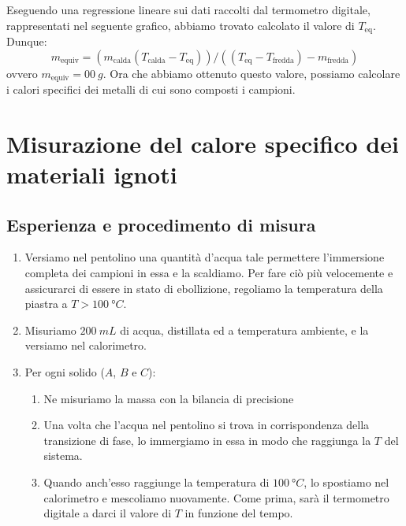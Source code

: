\documentclass{article}
\begin{document}
Eseguendo una regressione lineare sui dati raccolti dal termometro digitale, rappresentati nel    %
seguente grafico, abbiamo trovato calcolato il valore di $T_\text{eq}$. Dunque:
    \[
        m_\text{equiv} = (m_\text{calda} (T_\text{calda}-T_\text{eq}))/((T_\text{eq}-T_\text{fredda}) - m_\text{fredda})
    \]
ovvero $m_\text{equiv} = \qty{00}{g}$. Ora che abbiamo ottenuto questo valore,    %
possiamo calcolare i calori specifici dei metalli di cui sono composti i campioni.



\section{Misurazione del calore specifico dei materiali ignoti}
    
\subsection{Esperienza e procedimento di misura}

\begin{enumerate}
    \item
        Versiamo nel pentolino una quantità d'acqua tale permettere l'immersione
        completa dei campioni in essa e la scaldiamo. Per fare ciò più velocemente
        e assicurarci di essere in stato di ebollizione, regoliamo la temperatura
        della piastra a $T>\qty{100}{\degree C}$.
    \item
        Misuriamo $\qty{200}{mL}$ di acqua, distillata ed a temperatura ambiente,
        e la versiamo nel calorimetro.
    \item
        Per ogni solido ($A$, $B$ e $C$):
    \begin{enumerate}
        \item
            Ne misuriamo la massa con la bilancia di precisione
        \item
            Una volta che l'acqua nel pentolino si trova in corrispondenza della
            transizione di fase, lo immergiamo in essa in modo che raggiunga la
            $T$ del sistema.
        \item
            Quando anch'esso raggiunge la temperatura di $\qty{100}{\degree C}$,
            lo spostiamo nel calorimetro e mescoliamo nuovamente. Come prima, sarà
            il termometro digitale a darci il valore di $T$ in funzione del tempo.
    \end{enumerate}
\end{enumerate}
\end{document}
